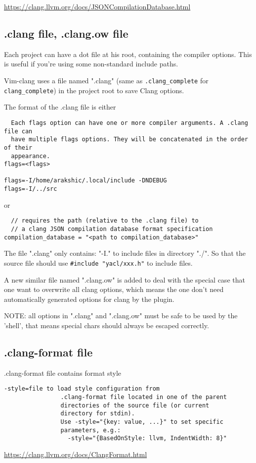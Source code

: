 \url{https://clang.llvm.org/docs/JSONCompilationDatabase.html}

\subsection{.clang file, .clang.ow file}
\label{sec:clang-dot-clang}

Each project can have a dot file at his root, containing
the compiler options. This is useful if you're using some
non-standard include paths.
        
        
Vim-clang uses a file named ".clang" (same as \verb!.clang_complete! for
\verb!clang_complete!) in the project root to save Clang options.

The format of the .clang file is either
\begin{verbatim}
  Each flags option can have one or more compiler arguments. A .clang file can
  have multiple flags options. They will be concatenated in the order of their
  appearance.  
flags=<flags>

flags=-I/home/arakshic/.local/include -DNDEBUG
flags=-I/../src
\end{verbatim}
or
\begin{verbatim}
  // requires the path (relative to the .clang file) to
  // a clang JSON compilation database format specification
compilation_database = "<path to compilation_database>"
\end{verbatim}

The file ".clang" only contains: "-I." to include files in directory "./".
So that the source file should use \verb!#include "yacl/xxx.h"! to include
files.

A new similar file named ".clang.ow" is added to deal with the special
case that one want to overwrite all clang options, which means the one don't
need automatically generated options for clang by the plugin.

NOTE: all options in ".clang" and ".clang.ow" must be safe to be used by the
'shell', that means special chars should always be escaped correctly.

\subsection{.clang-format file}
\label{sec:clang-dot-clang-format}

.clang-format file contains format style

\begin{verbatim}
-style=file to load style configuration from
                .clang-format file located in one of the parent
                directories of the source file (or current
                directory for stdin).
                Use -style="{key: value, ...}" to set specific
                parameters, e.g.:
                  -style="{BasedOnStyle: llvm, IndentWidth: 8}"
\end{verbatim}
\url{https://clang.llvm.org/docs/ClangFormat.html}

